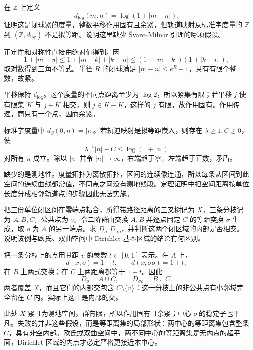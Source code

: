 \begin{exercise}\label{g3:ex:D-logarithmic-metric}
	在 \(\mathbb Z\) 上定义
	\[
		d_{\log}(m,n)=\log(1+|m-n|).
	\]
	证明这是闭球紧的度量，整数平移作用固有且余紧，但轨道映射从标准字度量的 \(\mathbb Z\) 到 \((\mathbb Z,d_{\log})\) 不是拟等距。说明这里缺少 Švarc--Milnor 引理的哪项假设。
\end{exercise}
\begin{solution}
	正定性和对称性直接由绝对值得到。因
	\[
		1+|m-n|\le1+|m-k|+|k-n|
		\le(1+|m-k|)(1+|k-n|),
	\]
	取对数得到三角不等式。半径 \(R\) 的闭球满足
	\(|m-n|\le e^R-1\)，只有有限个整数，故紧。

	平移保持 \(d_{\log}\)。这个度量的不同点距离至少为 \(\log2\)，所以紧集有限；若平移 \(j\) 使有限集 \(K\) 与 \(j+K\) 相交，则 \(j\in K-K\)，这样的 \(j\) 有限，故作用固有。作用传递，商只有一个点，因而余紧。

	标准字度量中 \(d_S(0,n)=|n|\)。若轨道映射是拟等距嵌入，则存在 \(\lambda\ge1,C\ge0\)，使
	\[
		\lambda^{-1}|n|-C\le\log(1+|n|)
	\]
	对所有 \(n\) 成立。除以 \(|n|\) 并令 \(|n|\to\infty\)，右端趋于零，左端趋于正数，矛盾。

	缺少的是测地性。度量拓扑为离散拓扑，区间的连续像连通，所以每条从区间到此空间的连续曲线都常值，不同点之间没有测地线段。定理证明中把空间距离按单位长度分成相邻轨道点的步骤因此无法实施。
\end{solution}

\begin{exercise}\label{g3:ex:D-tripod-dirichlet}
	把三份单位闭区间在零端点粘合，所得带路径距离的三叉树记为 \(X\)，三条分枝记为 \(A,B,C\)，公共点为 \(v\)。令二阶群由交换 \(A,B\) 并逐点固定 \(C\) 的等距变换 \(\sigma\) 生成，取 \(o\) 为 \(A\) 的另一端点。求 \(D_o,D_{\sigma o}\)，并判断这两个闭区域的内部是否相交。说明该例与欧氏、双曲空间中 Dirichlet 基本区域的结论有何区别。
\end{exercise}
\begin{solution}
	把一条分枝上的点用其距 \(v\) 的参数 \(t\in[0,1]\) 表示。在 \(A\) 上，
	\[
		d(x,o)=1-t,\qquad d(x,\sigma o)=1+t;
	\]
	在 \(B\) 上两式交换；在 \(C\) 上两距离都等于 \(1+t\)。因此
	\[
		D_o=A\cup C,\qquad D_{\sigma o}=B\cup C.
	\]
	两者覆盖 \(X\)，而且它们的内部交包含 \(C\setminus\{v\}\)：这一分枝上的非公共点有小邻域完全留在 \(C\) 内。实际上这正是内部的交。

	此处 \(X\) 紧且为测地空间，群有限，所以作用固有且余紧；中心 \(o\) 的稳定子也平凡。失败的并非这些假设，而是等距离集的局部形状：两中心的等距离集包含整条 \(C\)，具有非空内部。欧氏或双曲空间中，两不同中心的等距离集是无内点的超平面，Dirichlet 区域的内点才必定严格更接近本中心。
\end{solution}

